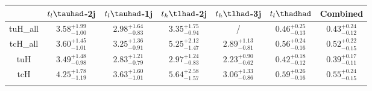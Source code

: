 
\centering
\begin{tabular}{ccccccc} \toprule\toprule
 & $t_l\tauhad$-2j & $t_l\tauhad$-1j & $t_h\tlhad$-2j  & $t_h\tlhad$-3j & $t_l\thadhad$ & Combined \\\midrule
tuH\_all & $3.58^{+1.99}_{-1.00}$ & $2.98^{+1.64}_{-0.83}$ & $3.35^{+1.75}_{-0.94}$&  / &$0.46^{+0.25}_{-0.13}$& $0.43^{+0.24}_{-0.12}$\\
tcH\_all & $3.60^{+1.45}_{-1.01}$ & $3.25^{+1.36}_{-0.91}$ & $5.25^{+2.12}_{-1.47}$& $2.89^{+1.13}_{-0.81}$ & $0.56^{+0.24}_{-0.16}$ & $0.52^{+0.22}_{-0.15}$\\
tuH & $3.49^{+1.48}_{-0.98}$ & $2.83^{+1.21}_{-0.79}$ & $2.97^{+1.24}_{-0.83}$ & $2.23^{+0.90}_{-0.62}$ & $0.42^{+0.18}_{-0.12}$ & $0.39^{+0.17}_{-0.11}$\\
tcH & $4.25^{+1.78}_{-1.19}$ & $3.63^{+1.60}_{-1.01}$ & $5.64^{+2.58}_{-1.57}$ & $3.06^{+1.33}_{-0.86}$ & $0.59^{+0.26}_{-0.16}$ & $0.55^{+0.24}_{-0.15}$\\
\bottomrule\bottomrule\\
\end{tabular}
